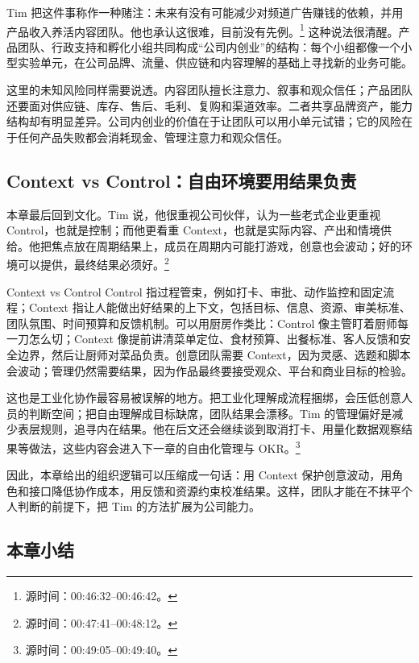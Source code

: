 \documentclass[a4paper]{article}
\begin{document}
Tim 把这件事称作一种赌注：未来有没有可能减少对频道广告赚钱的依赖，并用产品收入养活内容团队。他也承认这很难，目前没有先例。\footnote{源时间：00:46:32--00:46:42。} 这种说法很清醒。产品团队、行政支持和孵化小组共同构成“公司内创业”的结构：每个小组都像一个小型实验单元，在公司品牌、流量、供应链和内容理解的基础上寻找新的业务可能。

这里的未知风险同样需要说透。内容团队擅长注意力、叙事和观众信任；产品团队还要面对供应链、库存、售后、毛利、复购和渠道效率。二者共享品牌资产，能力结构却有明显差异。公司内创业的价值在于让团队可以用小单元试错；它的风险在于任何产品失败都会消耗现金、管理注意力和观众信任。

\subsection{Context vs Control：自由环境要用结果负责}

本章最后回到文化。Tim 说，他很重视公司伙伴，认为一些老式企业更重视 Control，也就是控制；而他更看重 Context，也就是实际内容、产出和情境供给。他把焦点放在周期结果上，成员在周期内可能打游戏，创意也会波动；好的环境可以提供，最终结果必须好。\footnote{源时间：00:47:41--00:48:12。}

\begin{knowledgebox}{Context vs Control}
Control 指过程管束，例如打卡、审批、动作监控和固定流程；Context 指让人能做出好结果的上下文，包括目标、信息、资源、审美标准、团队氛围、时间预算和反馈机制。可以用厨房作类比：Control 像主管盯着厨师每一刀怎么切；Context 像提前讲清菜单定位、食材预算、出餐标准、客人反馈和安全边界，然后让厨师对菜品负责。创意团队需要 Context，因为灵感、选题和脚本会波动；管理仍然需要结果，因为作品最终要接受观众、平台和商业目标的检验。
\end{knowledgebox}

这也是工业化协作最容易被误解的地方。把工业化理解成流程捆绑，会压低创意人员的判断空间；把自由理解成目标缺席，团队结果会漂移。Tim 的管理偏好是减少表层规则，追寻内在结果。他在后文还会继续谈到取消打卡、用量化数据观察结果等做法，这些内容会进入下一章的自由化管理与 OKR。\footnote{源时间：00:49:05--00:49:40。}

因此，本章给出的组织逻辑可以压缩成一句话：用 Context 保护创意波动，用角色和接口降低协作成本，用反馈和资源约束校准结果。这样，团队才能在不抹平个人判断的前提下，把 Tim 的方法扩展为公司能力。

\subsection{本章小结}
\end{document}
